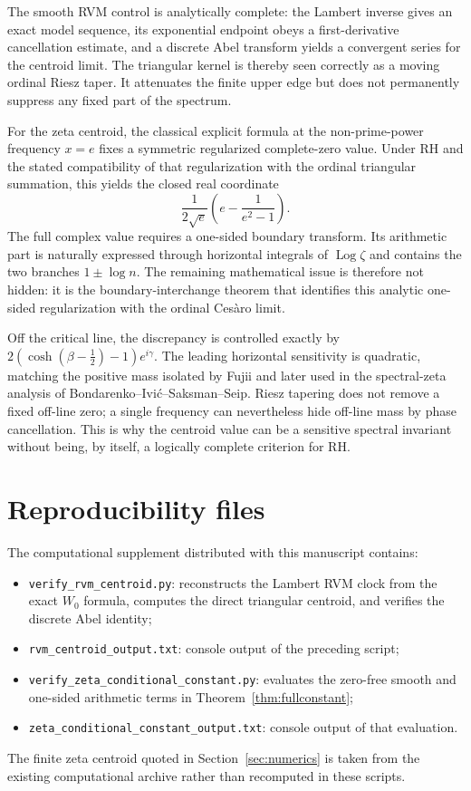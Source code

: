 \documentclass[11pt]{article}
\theoremstyle{definition}
\theoremstyle{remark}
\newcommand{\Log}{\operatorname{Log}}
\begin{document}
The smooth RVM control is analytically complete: the Lambert inverse gives an exact model sequence, its exponential endpoint obeys a first-derivative cancellation estimate, and a discrete Abel transform yields a convergent series for the centroid limit.  The triangular kernel is thereby seen correctly as a moving ordinal Riesz taper.  It attenuates the finite upper edge but does not permanently suppress any fixed part of the spectrum.

For the zeta centroid, the classical explicit formula at the non-prime-power frequency $x=e$ fixes a symmetric regularized complete-zero value.  Under RH and the stated compatibility of that regularization with the ordinal triangular summation, this yields the closed real coordinate
\[
\frac{1}{2\sqrt e}\left(e-\frac1{e^2-1}\right).
\]
The full complex value requires a one-sided boundary transform.  Its arithmetic part is naturally expressed through horizontal integrals of $\Log\zeta$ and contains the two branches $1\pm\log n$.  The remaining mathematical issue is therefore not hidden: it is the boundary-interchange theorem that identifies this analytic one-sided regularization with the ordinal Cesàro limit.

Off the critical line, the discrepancy is controlled exactly by $2(\cosh(\beta-\tfrac12)-1)e^{i\gamma}$.  The leading horizontal sensitivity is quadratic, matching the positive mass isolated by Fujii and later used in the spectral-zeta analysis of Bondarenko--Ivić--Saksman--Seip.  Riesz tapering does not remove a fixed off-line zero; a single frequency can nevertheless hide off-line mass by phase cancellation.  This is why the centroid value can be a sensitive spectral invariant without being, by itself, a logically complete criterion for RH.

\appendix
\section{Reproducibility files}
The computational supplement distributed with this manuscript contains:
\begin{itemize}[leftmargin=2em]
\item \texttt{verify\_rvm\_centroid.py}: reconstructs the Lambert RVM clock from the exact $W_0$ formula, computes the direct triangular centroid, and verifies the discrete Abel identity;
\item \texttt{rvm\_centroid\_output.txt}: console output of the preceding script;
\item \texttt{verify\_zeta\_conditional\_constant.py}: evaluates the zero-free smooth and one-sided arithmetic terms in Theorem~\ref{thm:fullconstant};
\item \texttt{zeta\_conditional\_constant\_output.txt}: console output of that evaluation.
\end{itemize}
The finite zeta centroid quoted in Section~\ref{sec:numerics} is taken from the existing computational archive rather than recomputed in these scripts.
\end{document}
